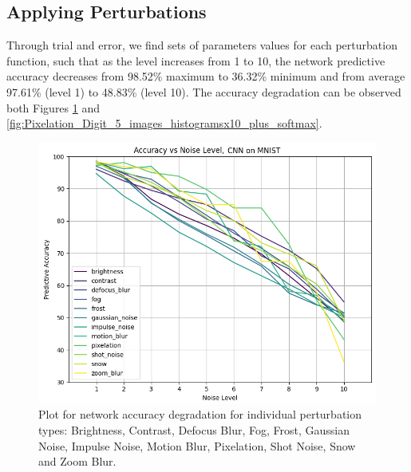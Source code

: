 
\subsection{Applying Perturbations}
Through trial and error, we find sets of parameters values
for each perturbation function, such that as the level increases from 1 to
10, the network predictive accuracy decreases from 98.52\%
maximum to 36.32\% minimum and from average 97.61\%
(level 1) to 48.83\% (level 10). The accuracy degradation can be observed both Figures 
\ref{fig:Accuracy_vs_Noise_types} and \ref{fig:Pixelation_Digit_5_images_histogramsx10_plus_softmax}.

\begin{figure}[h] 
\begin{center}
\includegraphics[width=0.99\columnwidth]{Figures/accuracy_vs_noise_types_plot.png}
\end{center}
\caption{Plot for network accuracy degradation for individual perturbation types: Brightness, Contrast, Defocus Blur, Fog, Frost, Gaussian Noise, Impulse Noise, Motion Blur, Pixelation, Shot Noise, Snow and Zoom Blur.}
\label{fig:Accuracy_vs_Noise_types}
\end{figure}

